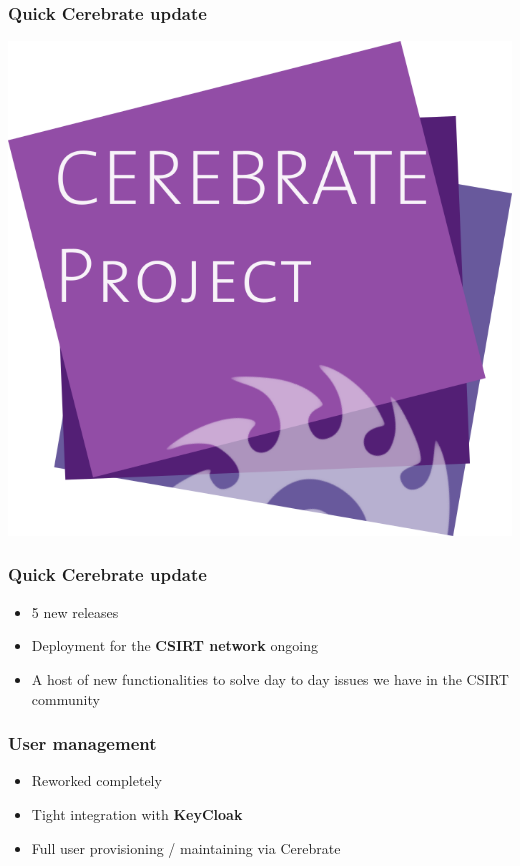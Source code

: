 \begin{frame}
\frametitle{Quick Cerebrate update}
\begin{center}
\includegraphics[scale=0.4]{images/cerebrate.png}
\end{center}
\end{frame}

\begin{frame}
  \frametitle{Quick Cerebrate update}
  \begin{itemize}
     \item 5 new releases
     \item Deployment for the {\bf CSIRT network} ongoing
     \item A host of new functionalities to solve day to day issues we have in the CSIRT community
  \end{itemize}
\end{frame}

\begin{frame}
  \frametitle{User management}
  \begin{itemize}
     \item Reworked completely
     \item Tight integration with {\bf KeyCloak}
     \item Full user provisioning / maintaining via Cerebrate
  \end{itemize}
\end{frame}

